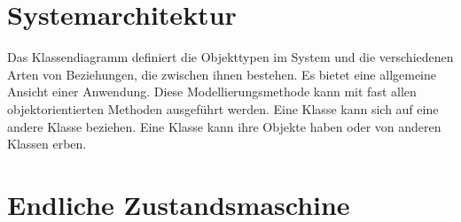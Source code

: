 \section{Systemarchitektur}
\label{sec:design:arch}
Das Klassendiagramm definiert die Objekttypen im System und die verschiedenen Arten von Beziehungen, die zwischen ihnen bestehen. Es bietet eine allgemeine Ansicht einer Anwendung. Diese Modellierungsmethode kann mit fast allen objektorientierten Methoden ausgeführt werden. Eine Klasse kann sich auf eine andere Klasse beziehen. Eine Klasse kann ihre Objekte haben oder von anderen Klassen erben.

\section{Endliche Zustandsmaschine}
\label{sec:design:fsm}
